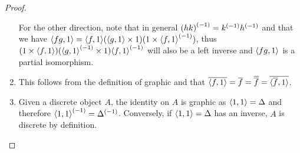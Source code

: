 \begin{proof}
\begin{enumerate}[{(}i{)}]
    For the other direction, note that in general ${(h k)}^{(-1)} = {k}^{(-1)}{h}^{(-1)}$ and that
    we have $\langle f g,1\rangle = \langle f,1\rangle (\langle g,1\rangle\times 1)  (1 \times {\langle f,1\rangle}^{(-1)})$, thus
    $(1\times \langle f,1\rangle)  ({\langle g,1\rangle}^{(-1)}\times 1) {\langle f,1\rangle}^{(-1)}$ will also be a left inverse and
    $\langle f g,1\rangle$ is a partial isomorphism.

    \item This follows from the definition of graphic and that
       $\overline{\langle f,1\rangle} = \overline{f} = \overline{\overline{f}} = \overline{\langle\overline{f},1\rangle}$.

    \item Given a discrete object $A$, the identity on $A$ is graphic as $\langle1,1\rangle = \Delta$
      and therefore ${\langle1,1\rangle}^{(-1)} = {\Delta}^{(-1)}$. Conversely, if $\langle1,1\rangle = \Delta$ has an
      inverse, $A$ is discrete by definition.
  \end{enumerate}
\end{proof}

